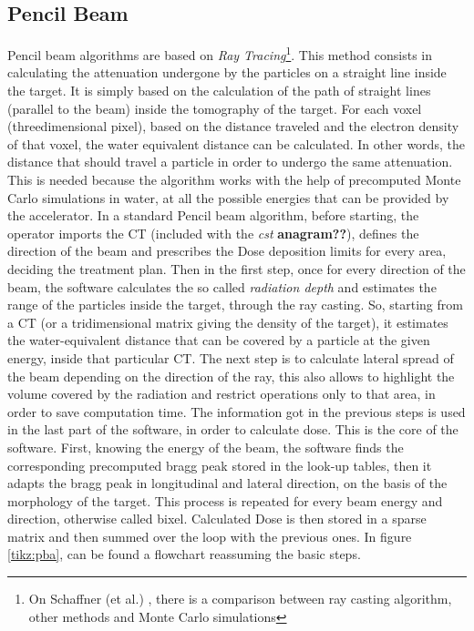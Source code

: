 \documentclass[12pt, a4paper, twoside]{book}
\begin{document}

\subsection{Pencil Beam} 
\label{sec:pen}
Pencil beam algorithms are based on \emph{Ray Tracing}\footnote{On Schaffner (et al.) \cite{schaf:pba}, there is a comparison between ray casting algorithm, other methods and Monte Carlo simulations}. This method consists in calculating the attenuation undergone by the particles on a straight line inside the target. It is simply based on the calculation of the path of straight lines (parallel to the beam) inside the tomography of the target. For each voxel (threedimensional pixel), based on the distance traveled and the electron density of that voxel, the water equivalent distance can be calculated. In other words, the distance that should travel a particle in order to undergo the same attenuation.
This is needed because the algorithm works with the help of precomputed Monte Carlo simulations in water, at all the possible energies that can be provided by the accelerator. In a standard Pencil beam algorithm, before starting, the operator imports the CT (included with the \emph{cst} \textbf{anagram??}), defines the direction of the beam and prescribes the Dose deposition limits for every area, deciding the treatment plan.
Then in the first step, once for every direction of the beam, the software calculates the so called \emph{radiation depth} and estimates the range of the particles inside the target, through the ray casting. So, starting from a CT (or a tridimensional matrix giving the density of the target), it estimates the water-equivalent distance that can be covered by a particle at the given energy, inside that particular CT. 
The next step is to calculate lateral spread of the beam depending on the direction of the ray, this also allows to highlight the volume covered by the radiation and restrict operations only to that area, in order to save computation time. 
The information got in the previous steps is used in the last part of the software, in order to calculate dose.
This is the core of the software. First, knowing the energy of the beam, the software finds the corresponding precomputed bragg peak stored in the look-up tables, then it adapts the bragg peak in longitudinal and lateral direction, on the basis of the morphology of the target. 
This process is repeated for every beam energy and direction, otherwise called bixel.
Calculated Dose is then stored in a sparse matrix and then summed over the loop with the previous ones.
In figure \ref{tikz:pba}, can be found a flowchart reassuming the basic steps.
\end{document}
